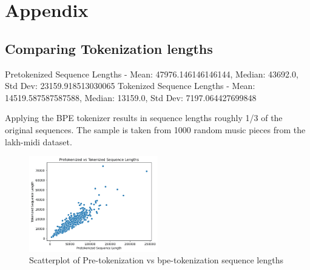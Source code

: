 
\chapter{Appendix}
\section{Comparing Tokenization lengths}
\label{tok_compare}
Pretokenized Sequence Lengths - Mean: 47976.146146146144, Median: 43692.0, Std Dev: 23159.918513030065
Tokenized Sequence Lengths - Mean: 14519.587587587588, Median: 13159.0, Std Dev: 7197.064427699848

Applying the BPE tokenizer results in sequence lengths roughly 1/3 of the original sequences. The sample is taken from 1000 random music pieces from the lakh-midi dataset. 

\begin{figure}[H]
    \centering
    \includegraphics[width=0.5\textwidth]{IMAGES/scatter_pre_post_tok.png} 
    \caption{Scatterplot of Pre-tokenization vs bpe-tokenization sequence lengths}
    \label{fig:tok_compare}
\end{figure}

